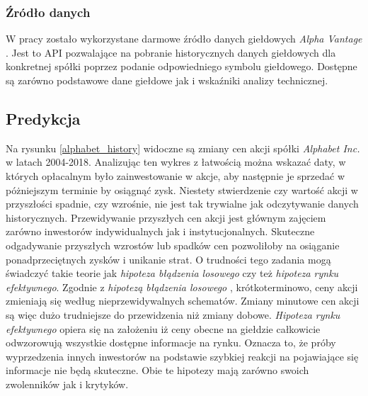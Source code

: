 \documentclass[a4paper, twoside, 11pt, openright]{article}
\begin{document}
\subsubsection{Źródło danych}

W pracy zostało wykorzystane darmowe źródło danych giełdowych \textit{Alpha Vantage} \cite{alphavantage}. Jest to API pozwalające na pobranie historycznych danych giełdowych dla konkretnej spółki poprzez podanie odpowiedniego symbolu giełdowego. Dostępne są zarówno podstawowe dane giełdowe jak i wskaźniki analizy technicznej. 

\subsection{Predykcja}

Na rysunku \ref{alphabet_history} widoczne są zmiany cen akcji spółki \textit{Alphabet Inc.} w latach 2004-2018. Analizując ten wykres z łatwością można wskazać daty, w których opłacalnym było zainwestowanie w akcje, aby następnie je sprzedać w póżniejszym terminie by osiągnąć zysk. Niestety stwierdzenie czy wartość akcji w przyszłości spadnie, czy wzrośnie, nie jest tak trywialne jak odczytywanie danych historycznych. Przewidywanie przyszłych cen akcji jest głównym zajęciem zarówno inwestorów indywidualnych jak i instytucjonalnych. Skuteczne odgadywanie przyszłych wzrostów lub spadków cen pozwoliłoby na osiąganie ponadprzeciętnych zysków i unikanie strat. O trudności tego zadania mogą świadczyć takie teorie jak \textit{hipoteza błądzenia losowego} czy też \textit{hipoteza rynku efektywnego}. Zgodnie z \textit{hipotezą błądzenia losowego} \cite{randwalk}, krótkoterminowo, ceny akcji zmieniają się według nieprzewidywalnych schematów. Zmiany minutowe cen akcji są więc dużo trudniejsze do przewidzenia niż zmiany dobowe. \textit{Hipoteza rynku efektywnego} \cite{efficientmarket} opiera się na założeniu iż ceny obecne na giełdzie całkowicie odwzorowują wszystkie dostępne informacje na rynku. Oznacza to, że próby wyprzedzenia innych inwestorów na podstawie szybkiej reakcji na pojawiające się informacje nie będą skuteczne. Obie te hipotezy mają zarówno swoich zwolenników jak i krytyków.
\end{document}
